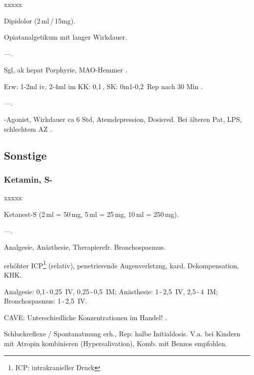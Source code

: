 \begin{labeling}[~]{xxxxx}
  \item[Präparate:]  Dipidolor (2\,ml\,/\,15mg).
  \item[Beschreibung:]   Opiatanalgetikum mit langer Wirkdauer.
  \item[I:] ---.
  \item[KI:]  Sgl, ak hepat Porphyrie, MAO-Hemmer .
  \item[Rx:]  Erw: 1-2ml iv, 2-4ml im\newline
KK: 0,1\,, SK: 0m1-0,2\,\newline
Rep nach 30 Min .
  \item[Cave:] ---.
  \item[Anm:]  {\textmu}-Agonist, Wirkdauer ca 6 Std, Atemdepression, Dosisred. Bei
älteren Pat, LPS, schlechtem AZ .
\end{labeling}


\subsection{Sonstige}

\subsubsection{Ketamin, S-}

\begin{labeling}[~]{xxxxx}
  \item[Präparate:]  Ketanest-S (2\,ml = 50\,mg, 5\,ml = 25\,mg, 10\,ml =
  250\,mg).
  \item[Beschreibung:] ---.
  \item[I:] Analgesie, Anästhesie, Therapierefr. Bronchospasmus.
  \item[KI:]   erhöhter ICP\footnote{ICP: intrakranieller Druck} (relativ),
  penetrierende Augenverletzng, kard. Dekompensation, KHK.
  \item[\textrecipe :]
  Analgesie: 0,1\,-\,0,25\, IV, 0,25\,-\,0,5\, IM;
  Anästhesie: 1\,-\,2,5\, IV, 2,5\,-\,4\, IM;
  Bronchospasmus: 1\,-\,2,5\, IV.
  \item[Cave:]   CAVE: Unterschiedliche Konzentrationen im Handel! .
  \item[Anm:]   Schluckreflexe / Spontanatmung erh., Rep: halbe Initialdosis.
  V.a. bei Kindern mit Atropin kombinieren (Hypersalivation), Komb. mit Benzos
  empfohlen.
\end{labeling}



